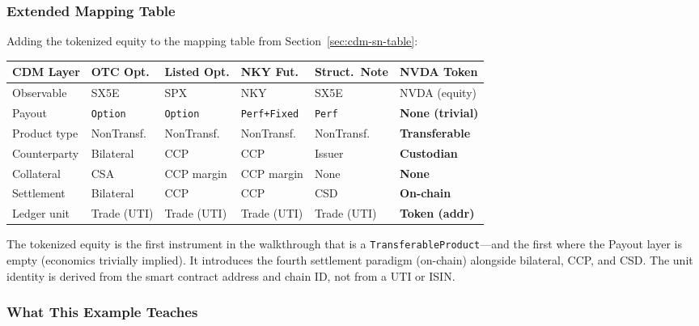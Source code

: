 \documentclass[11pt,a4paper]{article}
\begin{document}
\subsubsection{Extended Mapping Table}
\label{sec:cdm-tokenized-table}

Adding the tokenized equity to the mapping table from Section~\ref{sec:cdm-sn-table}:

\begin{center}
\small
\begin{tabular}{l l l l l l}
\toprule
\textbf{CDM Layer} & \textbf{OTC Opt.} & \textbf{Listed Opt.} & \textbf{NKY Fut.} & \textbf{Struct.\ Note} & \textbf{NVDA Token} \\
\midrule
Observable & SX5E & SPX & NKY & SX5E & NVDA (equity) \\
Payout & \texttt{Option} & \texttt{Option} & \texttt{Perf+Fixed} & \texttt{Perf} & \textbf{None (trivial)} \\
Product type & NonTransf. & NonTransf. & NonTransf. & NonTransf. & \textbf{Transferable} \\
Counterparty & Bilateral & CCP & CCP & Issuer & \textbf{Custodian} \\
Collateral & CSA & CCP margin & CCP margin & None & \textbf{None} \\
Settlement & Bilateral & CCP & CCP & CSD & \textbf{On-chain} \\
Ledger unit & Trade (UTI) & Trade (UTI) & Trade (UTI) & Trade (UTI) & \textbf{Token (addr)} \\
\bottomrule
\end{tabular}
\end{center}

\noindent The tokenized equity is the first instrument in the walkthrough that is a \texttt{TransferableProduct}---and the first where the Payout layer is empty (economics trivially implied). It introduces the fourth settlement paradigm (on-chain) alongside bilateral, CCP, and CSD. The unit identity is derived from the smart contract address and chain ID, not from a UTI or ISIN.

\subsubsection{What This Example Teaches}
\label{sec:cdm-tokenized-lessons}
\end{document}

